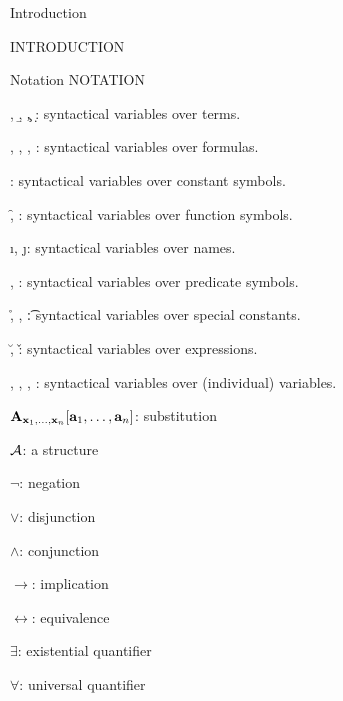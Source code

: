  {Introduction}
\centerline{\xmplbxi INTRODUCTION}
\bigskip

 {Notation}
\beginsection NOTATION

{\leftskip 1in
\item{\a, \b, \c, \d:} syntactical variables over terms.
\item{\A, \B, \C, \D:} syntactical variables over formulas.
\item{\e:} syntactical variables over constant symbols.
\item{\f, \g:} syntactical variables over function symbols.
\item{\i, \j:} syntactical variables over names.
\item{\p, \q:} syntactical variables over predicate symbols.
\item{\r, \s, \t:} syntactical variables over special constants.
\item{\u, \v:} syntactical variables over expressions.
\item{\x, \y, \z, \w:} syntactical variables over (individual) variables.
\item{${\bf A}_{{\bf x}_1,\dots,{\bf x}_n}[{\bf a}_1, \dots, {\bf a}_n]$:} substitution
\item{${\cal A}$:} a structure
\item{$\neg$:} negation
\item{$\lor$:} disjunction
\item{$\land$:} conjunction
\item{$\to$:} implication
\item{$\leftrightarrow$:} equivalence
\item{$\exists$:} existential quantifier
\item{$\forall$:} universal quantifier
\par}

\vfill
\break
